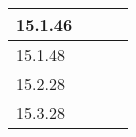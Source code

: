 \documentclass[12pt]{amsart}
\begin{document}
\begin{longtable}{p{4cm}|c|c|c}
        15.1.46 & & \\ \hline
        15.1.48 & & \\ \hline
        15.2.28 & & \\ \hline
        15.3.28 & & \\ \hline
        

    \end{longtable}
\end{document}
